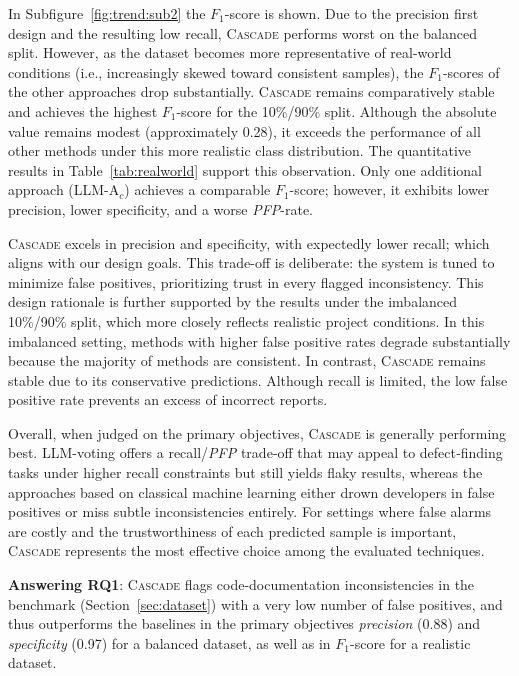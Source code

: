 \documentclass[acmsmall, screen]{acmart}
\newcommand{\tool}{\textsc{Cascade}\xspace}
\begin{document}
In Subfigure~\ref{fig:trend:sub2} the $F_{1}$-score is shown. Due to the precision first design and the resulting low recall, \tool performs worst on the balanced split. However, as the dataset becomes more representative of real-world conditions (i.e., increasingly skewed toward consistent samples), the $F_{1}$-scores of the other approaches drop substantially. \tool remains comparatively stable and achieves the highest $F_{1}$-score for the 10\%/90\% split. Although the absolute value remains modest (approximately 0.28), it exceeds the performance of all other methods under this more realistic class distribution.
The quantitative results in Table~\ref{tab:realworld} support this observation. Only one additional approach (LLM-A$_{c}$) achieves a comparable $F_{1}$-score; however, it exhibits lower precision, lower specificity, and a worse \textit{PFP}-rate.


\tool excels in precision and specificity, with expectedly lower recall; which aligns with our design goals. This trade-off is deliberate: the system is tuned to minimize false positives, prioritizing trust in every flagged inconsistency. 
This design rationale is further supported by the results under the imbalanced 10\%/90\% split, which more closely reflects realistic project conditions.
In this imbalanced setting, methods with higher false positive rates degrade substantially because the majority of methods are consistent. In contrast, \tool remains stable due to its conservative predictions. Although recall is limited, the low false positive rate prevents an excess of incorrect reports.

Overall, when judged on the primary objectives, \tool is generally performing best. 
LLM-voting offers a recall/\textit{PFP} trade‑off that may appeal to defect‑finding tasks under higher recall constraints but still yields flaky results, whereas the approaches based on classical machine learning either drown developers in false positives or miss subtle inconsistencies entirely.
For settings where false alarms are costly and the trustworthiness of each predicted sample is important, \tool represents the most effective choice among the evaluated techniques.

\begin{tcolorbox}[mystyle]
\textbf{Answering RQ1}: \tool flags code-documentation inconsistencies in the benchmark (Section~\ref{sec:dataset}) with a very low number of false positives, and thus outperforms the baselines in the primary objectives \emph{precision} (0.88) and \emph{specificity} (0.97) for a balanced dataset, as well as in $F_{1}$-score for a realistic dataset.
\end{tcolorbox}
\end{document}

